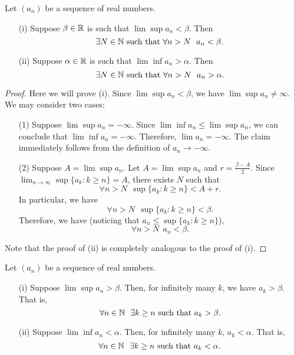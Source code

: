 \documentclass[a4paper]{article}
\begin{document}
\begin{theorem}[ ]
    Let \( ({a}_{n}) \) be a sequence of real numbers. 
    \begin{enumerate}
        \item[(i)] Suppose \( \beta \in \mathbb{R}  \) is such that \( \lim \sup  {a}_{n} < \beta\). Then
            \[  \exists N \in \N \ \text{such that} \ \forall n > N \ \ {a}_{n} < \beta. \]
        \item[(ii)] Suppose \( \alpha \in \mathbb{R}  \) is such that \( \lim \inf {a}_{n} > \alpha \). Then 
            \[  \exists N \in \N \ \text{such that} \ \forall n > N \ \ {a}_{n} > \alpha. \]
    \end{enumerate}
\end{theorem}
\begin{proof}
Here we will prove (i). Since \( \lim \sup {a}_{n} < \beta \), we have \( \lim \sup {a}_{n} \neq \infty  \). We may consider two cases:
\begin{enumerate}
    \item[(1)] Suppose \( \lim \sup {a}_{n} = - \infty  \). Since \( \lim \inf {a}_{n} \leq \lim \sup {a}_{n} \), we can conclude that \( \lim \inf {a}_{n} = - \infty   \). Therefore, \( \lim {a}_{n} = - \infty  \). The claim immediately follows from the definition of \( {a}_{n} \to - \infty  \).
    \item[(2)] Suppose \( A = \lim \sup {a}_{n} \). Let \( A = \lim \sup {a}_{n} \) and \( r = \frac{ \beta - A  }{  2  }  \). Since \( \lim_{ n \to \infty  }  \sup \{ {a}_{k } : k \geq n  \}  = A  \), there exists \( N  \) such that 
        \[  \forall n > N \ \ \sup \{ {a}_{k } : k \geq n  \}  < A + r. \]
        In particular, we have 
        \[  \forall n > N \ \ \sup \{ {a}_{k } : k \geq n  \}  < \beta. \]
        Therefore, we have (noticing that \( {a}_{n} \leq \sup \{ {a}_{k }: k \geq n  \}  \)), 
        \[  \forall n > N \ \ {a}_{n} < \beta. \]
\end{enumerate}
Note that the proof of (ii) is completely analogous to the proof of (i).
\end{proof}

\begin{theorem}[ ]
    Let \( ({a}_{n}) \) be a sequence of real numbers. 
    \begin{enumerate}
        \item[(i)] Suppose \( \lim \sup {a}_{n} > \beta \). Then, for infinitely many \( k  \), we have \( {a}_{k} > \beta \). That is,
            \[  \forall n \in \mathbb{N} \ \ \exists k \geq n \ \text{such that} \ {a}_{k} > \beta. \]
        \item[(ii)] Suppose \( \lim \inf {a}_{n} < \alpha \). Then, for infinitely many \( k  \), \( {a}_{k} < \alpha \). That is, 
            \[  \forall n \in \mathbb{N} \ \ \exists k \geq n \ \text{such that} \ {a}_{k} < \alpha. \]
    \end{enumerate}
\end{theorem}
\end{document}
